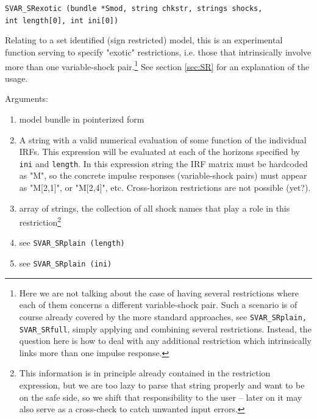 \documentclass[a4paper,10pt]{article}
\newenvironment{funcdoc}[1]
{\noindent\hrulefill\newline\nopagebreak\texttt{#1}%
\nopagebreak\par\noindent\hrulefill%
\nopagebreak\par\nopagebreak\smallskip\nopagebreak\par}
{\bigskip}
\begin{document}
\begin{funcdoc}{SVAR\_SRexotic (bundle *Smod, string chkstr, strings shocks, \\
 int length[0], int ini[0])} %
 
 \noindent Relating to a set identified (sign restricted) model, this is an experimental function serving 
 to specify "exotic" restrictions, i.e. those that intrinsically involve more than one 
 variable-shock pair.\footnote{Here we are not talking about the case of having several 
 restrictions where each of them concerns a different variable-shock pair. Such a scenario 
 is of course already covered
 by the more standard approaches, see \texttt{SVAR\_SRplain, SVAR\_SRfull}, simply 
 applying and combining several restrictions. Instead, the question here is how to deal 
 with any additional restriction which intrinsically links more than one impulse response.}
 See section \ref{sec:SR} for an explanation of the usage. 
 
   \noindent Arguments:
 \begin{enumerate}
  \item model bundle in pointerized form
  \item A string with a valid numerical evaluation of some function of the individual IRFs.  
  This expression will be evaluated at each of the horizons specified by \texttt{ini} and 
  \texttt{length}. In this expression string the IRF matrix must be hardcoded as "M", so
  the concrete impulse responses (variable-shock pairs) must appear as "M[2,1]", or "M[2,4]",
  etc. 
  Cross-horizon restrictions are not possible (yet?).
  \item array of strings, the collection of all shock names that play a role in this restriction\footnote{%
  This information is in principle already contained in the restriction expression, but we are too 
  lazy to parse that string properly and want to be on the safe side, so we shift that responsibility
  to the user -- later on it may also serve as a cross-check to catch unwanted input errors.}
  \item see \texttt{SVAR\_SRplain (length)}
  \item see \texttt{SVAR\_SRplain (ini)}
 \end{enumerate}
 
\end{funcdoc}
\end{document}
